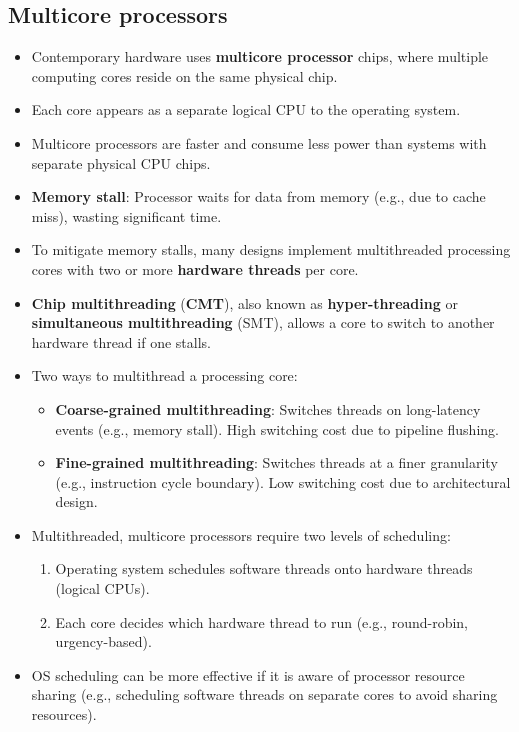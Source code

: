 \subsection{Multicore processors}
\begin{itemize}
    \item Contemporary hardware uses \textbf{multicore processor} chips, where multiple computing cores reside on the same physical chip.
    \item Each core appears as a separate logical CPU to the operating system.
    \item Multicore processors are faster and consume less power than systems with separate physical CPU chips.
    \item \textbf{Memory stall}: Processor waits for data from memory (e.g., due to cache miss), wasting significant time.
    \item To mitigate memory stalls, many designs implement multithreaded processing cores with two or more \textbf{hardware threads} per core.
    \item \textbf{Chip multithreading} (\textbf{CMT}), also known as \textbf{hyper-threading} or \textbf{simultaneous multithreading} (SMT), allows a core to switch to another hardware thread if one stalls.
    \item Two ways to multithread a processing core:
        \begin{itemize}
            \item \textbf{Coarse-grained multithreading}: Switches threads on long-latency events (e.g., memory stall). High switching cost due to pipeline flushing.
            \item \textbf{Fine-grained multithreading}: Switches threads at a finer granularity (e.g., instruction cycle boundary). Low switching cost due to architectural design.
        \end{itemize}
    \item Multithreaded, multicore processors require two levels of scheduling:
        \begin{enumerate}
            \item Operating system schedules software threads onto hardware threads (logical CPUs).
            \item Each core decides which hardware thread to run (e.g., round-robin, urgency-based).
        \end{enumerate}
    \item OS scheduling can be more effective if it is aware of processor resource sharing (e.g., scheduling software threads on separate cores to avoid sharing resources).
\end{itemize}

